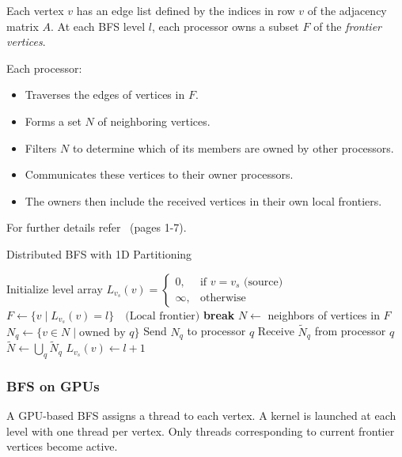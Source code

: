 \documentclass[12pt]{book}
\begin{document}
Each vertex $v$ has an edge list defined by the indices in row $v$ of the adjacency matrix $A$. At each BFS level $l$, each processor owns a subset $F$ of the \textit{frontier vertices}.

Each processor:
\begin{itemize}
    \item Traverses the edges of vertices in $F$.
    \item Forms a set $N$ of neighboring vertices.
    \item Filters $N$ to determine which of its members are owned by other processors.
    \item Communicates these vertices to their owner processors.
    \item The owners then include the received vertices in their own local frontiers.
\end{itemize}
For further details refer~\cite{yoo2005scalable} (pages 1-7).
\begin{algorithm}[H]
\caption{Distributed BFS with 1D Partitioning}
\label{alg:1DBFS}
\begin{algorithmic}[1]
\State Initialize level array $L_{v_s}(v) = \begin{cases}
    0, & \text{if } v = v_s \text{ (source)} \\
    \infty, & \text{otherwise}
\end{cases}$
    \State $F \gets \{v \mid L_{v_s}(v) = l\} \quad \text{(Local frontier)}$
        \State \textbf{break} 
    \EndIf
    \State $N \gets$ neighbors of vertices in $F$
        \State $N_q \gets \{v \in N \mid \text{owned by } q\}$
        \State Send $N_q$ to processor $q$
        \State Receive $\tilde{N}_q$ from processor $q$
    \EndFor
    \State $\tilde{N} \gets \bigcup_q \tilde{N}_q$ 
        \State $L_{v_s}(v) \gets l + 1$
    \EndFor
\EndFor
\end{algorithmic}
\end{algorithm}

\subsubsection{BFS on GPUs}

A GPU-based BFS assigns a thread to each vertex. A kernel is launched at each level with one thread per vertex. Only threads corresponding to current frontier vertices become active.
\end{document}

